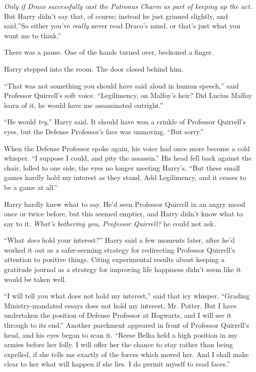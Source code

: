 \emph{Only if Draco successfully cast the Patronus Charm as part of
keeping up the act.} But Harry didn't say that, of course; instead he
just grinned slightly, and said,''So either you've \emph{really} never
read Draco's mind, or that's just what you want me to think.''

There was a pause. One of the hands turned over, beckoned a finger.

Harry stepped into the room. The door closed behind him.

``That was not something you should have said aloud in human speech,''
said Professor Quirrell's soft voice. ``Legilimency, on Malfoy's heir?
Did Lucius Malfoy learn of it, he would have me assassinated outright.''

``He would \emph{try},'' Harry said. It should have won a crinkle of
Professor Quirrell's eyes, but the Defense Professor's face was
unmoving. ``But sorry.''

When the Defense Professor spoke again, his voice had once more become a
cold whisper. ``I suppose I could, and pity the assassin.'' His head
fell back against the chair, lolled to one side, the eyes no longer
meeting Harry's. ``But these small games hardly hold my interest as they
stand. Add Legilimency, and it ceases to be a game at all.''

Harry hardly knew what to say. He'd seen Professor Quirrell in an angry
mood once or twice before, but this seemed emptier, and Harry didn't
know what to say to it. \emph{What's bothering you, Professor Quirrell?}
he could not ask\emph{.}

``What \emph{does} hold your interest?'' Harry said a few moments later,
after he'd worked it out as a safer-seeming strategy for redirecting
Professor Quirrell's attention to positive things. Citing experimental
results about keeping a gratitude journal as a strategy for improving
life happiness didn't seem like it would be taken well.

``I will tell you what does not hold my interest,'' said that icy
whisper. ``Grading Ministry-mandated essays does not hold my interest,
Mr. Potter. But I have undertaken the position of Defense Professor at
Hogwarts, and I will see it through to its end.'' Another parchment
appeared in front of Professor Quirrell's head, and his eyes began to
scan it. ``Reese Belka held a high position in my armies before her
folly. I will offer her the chance to stay rather than being expelled,
if she tells me exactly of the forces which moved her. And I shall make
clear to her what will happen if she lies. I do permit myself to read
faces.''

